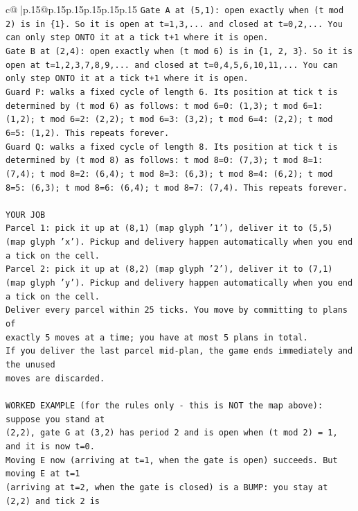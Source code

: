 \documentclass{article}
\begin{document}
{\begin{supertabular}{c@{$\;$}|p{.15\linewidth}@{}p{.15\linewidth}p{.15\linewidth}p{.15\linewidth}p{.15\linewidth}p{.15\linewidth}}
{{{\texttt{Gate A at (5,1): open exactly when (t mod 2) is in \{1\}. So it is open at t=1,3,... and closed at t=0,2,... You can only step ONTO it at a tick t+1 where it is open.} \\
\texttt{Gate B at (2,4): open exactly when (t mod 6) is in \{1, 2, 3\}. So it is open at t=1,2,3,7,8,9,... and closed at t=0,4,5,6,10,11,... You can only step ONTO it at a tick t+1 where it is open.} \\
\texttt{Guard P: walks a fixed cycle of length 6. Its position at tick t is determined by (t mod 6) as follows: t mod 6=0: (1,3); t mod 6=1: (1,2); t mod 6=2: (2,2); t mod 6=3: (3,2); t mod 6=4: (2,2); t mod 6=5: (1,2). This repeats forever.} \\
\texttt{Guard Q: walks a fixed cycle of length 8. Its position at tick t is determined by (t mod 8) as follows: t mod 8=0: (7,3); t mod 8=1: (7,4); t mod 8=2: (6,4); t mod 8=3: (6,3); t mod 8=4: (6,2); t mod 8=5: (6,3); t mod 8=6: (6,4); t mod 8=7: (7,4). This repeats forever.} \\
\\ 
\texttt{YOUR JOB} \\
\texttt{Parcel 1: pick it up at (8,1) (map glyph '1'), deliver it to (5,5) (map glyph 'x'). Pickup and delivery happen automatically when you end a tick on the cell.} \\
\texttt{Parcel 2: pick it up at (8,2) (map glyph '2'), deliver it to (7,1) (map glyph 'y'). Pickup and delivery happen automatically when you end a tick on the cell.} \\
\texttt{Deliver every parcel within 25 ticks. You move by committing to plans of} \\
\texttt{exactly 5 moves at a time; you have at most 5 plans in total.} \\
\texttt{If you deliver the last parcel mid{-}plan, the game ends immediately and the unused} \\
\texttt{moves are discarded.} \\
\\ 
\texttt{WORKED EXAMPLE (for the rules only {-} this is NOT the map above): suppose you stand at} \\
\texttt{(2,2), gate G at (3,2) has period 2 and is open when (t mod 2) = 1, and it is now t=0.} \\
\texttt{Moving E now (arriving at t=1, when the gate is open) succeeds. But moving E at t=1} \\
\texttt{(arriving at t=2, when the gate is closed) is a BUMP: you stay at (2,2) and tick 2 is} \\
}}}
\end{supertabular}}
\end{document}
